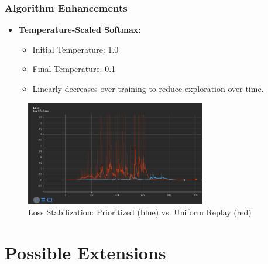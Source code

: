 \documentclass{beamer}
\begin{document}
\begin{frame}
\frametitle{Algorithm Enhancements}
\begin{itemize}
    \item \textbf{Temperature-Scaled Softmax:}
    \begin{itemize}
        \item Initial Temperature: 1.0
        \item Final Temperature: 0.1
        \item Linearly decreases over training to reduce exploration over time.
    \end{itemize}
\end{itemize}

\begin{figure}[ht]
    \centering
    \includegraphics[width=0.7\textwidth]{images/loss_comparison.png}
    \caption{Loss Stabilization: Prioritized (blue) vs. Uniform Replay (red)}
    \label{fig:loss_comparison}
\end{figure}
\end{frame}

\section{Possible Extensions}
\end{document}
